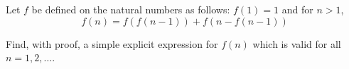 Let $f$ be defined on the natural numbers as follows: $f(1) = 1$ and for $n >
1$, $$f(n) = f(f(n - 1)) + f(n - f(n - 1))$$

Find, with proof, a simple explicit expression for $f(n)$ which is valid for
all $n = 1, 2, \dots$.
